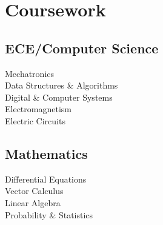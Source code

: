 \begin{minipage}[t]{0.33\textwidth}

 \section{Coursework}
 \subsection{ECE/Computer Science}
 Mechatronics \\
 Data Structures \& Algorithms \\
 Digital \& Computer Systems\\
 Electromagnetism \\
 Electric Circuits \\



 \sectionspace %

 \subsection{Mathematics}
 Differential Equations \\
 Vector Calculus \\
 Linear Algebra \\
 Probability \& Statistics \\







 \sectionspace %


\end{minipage} %
